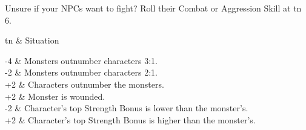 \documentclass[titlepage,a4paper,openany]{book}
\begin{document}
Unsure if your NPCs want to fight?  Roll their Combat or Aggression Skill at \gls{tn} 6.

\newcommand{\moralechart}{
	\begin{tcolorbox}[title={Morale Chart},arc=1mm,tabularx={cp{.75\textwidth}}]
		\gls{tn} & Situation \\\hline

		-4 & Monsters outnumber characters 3:1. \\

		-2 & Monsters outnumber characters 2:1. \\

		+2 & Characters outnumber the monsters. \\

		+2 & Monster is wounded. \\

		-2 & Character's top Strength Bonus is lower than the monster's.  \\

		+2 & Character's top Strength Bonus is higher than the monster's.  \\

	\end{tcolorbox}
}

\moralechart{}
\end{document}
